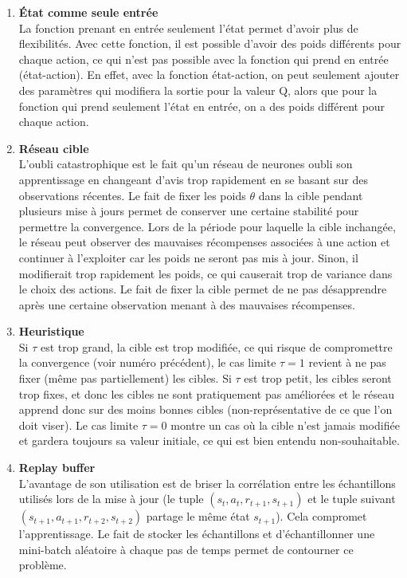 \documentclass[letterpaper,11pt]{article}
\begin{document}
\begin{enumerate}[label=(\alph*)]

\item \textbf{État comme seule entrée}\\
La fonction prenant en entrée seulement l'état permet d'avoir plus de flexibilités.
Avec cette fonction, il est possible d'avoir des poids différents pour chaque action, ce qui n'est pas possible avec la fonction qui prend en entrée (état-action). En effet, avec la fonction état-action, on peut seulement ajouter des paramètres qui modifiera la sortie pour la valeur Q, alors que pour la fonction qui prend seulement l'état en entrée, on a des poids différent pour chaque action.

\item \textbf{Réseau cible}\\
L'oubli catastrophique est le fait qu'un réseau de neurones oubli son apprentissage en changeant d'avis trop rapidement en se basant sur des observations récentes. Le fait de fixer les poids $\theta$ dans la cible pendant plusieurs mise à jours permet de conserver une certaine stabilité pour permettre la convergence. Lors de la période pour laquelle la cible inchangée, le réseau peut observer des mauvaises récompenses associées à une action et continuer à l'exploiter car les poids ne seront pas mis à jour. Sinon, il modifierait trop rapidement les poids, ce qui causerait trop de variance dans le choix des actions. Le fait de fixer la cible permet de ne pas désapprendre après une certaine observation menant à des mauvaises récompenses.  

\item \textbf{Heuristique}\\
Si $\tau$ est trop grand, la cible est trop modifiée, ce qui risque de compromettre la convergence (voir numéro précédent), le cas limite $\tau=1$ revient à ne pas fixer (même pas partiellement) les cibles. Si $\tau$ est trop petit, les cibles seront trop fixes, et donc les cibles ne sont pratiquement pas améliorées et le réseau apprend donc sur des moins bonnes cibles (non-représentative de ce que l'on doit viser). Le cas limite $\tau=0$ montre un cas où la cible n'est jamais modifiée et gardera toujours sa valeur initiale, ce qui est bien entendu non-souhaitable. 

\item \textbf{Replay buffer}\\
L'avantage de son utilisation est de briser la corrélation entre les échantillons utilisés lors de la mise à jour (le tuple $(s_t, a_t, r_{t+1}, s_{t+1})$ et le tuple suivant $(s_{t+1}, a_{t+1}, r_{t+2}, s_{t+2})$ partage le même état $s_{t+1}$). Cela compromet l'apprentissage. Le fait de stocker les échantillons et d'échantillonner une mini-batch aléatoire à chaque pas de temps permet de contourner ce problème. 


\end{enumerate}
\end{document}

